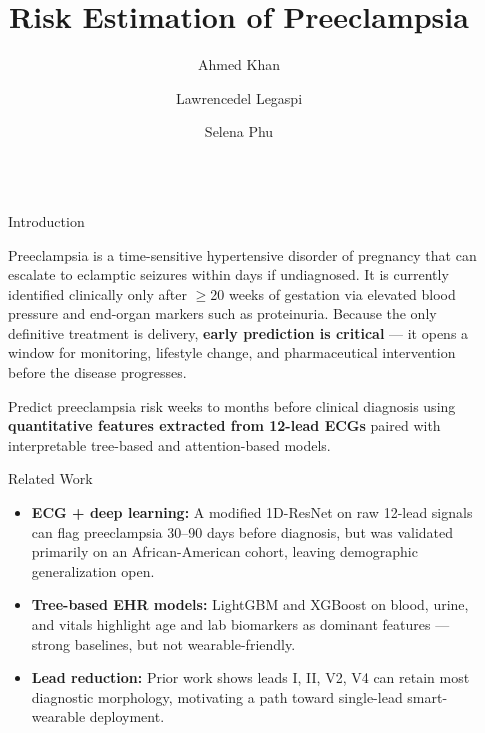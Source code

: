 \documentclass[final]{beamer}
\title{Risk Estimation of Preeclampsia}
\author{Ahmed Khan \and Lawrencedel Legaspi \and Selena Phu}
\institute[shortinst]{Department of Electrical and Computer Engineering}
\newlength{\sepwidth}
\newlength{\colwidth}
\newcommand{\separatorcolumn}{\begin{column}{\sepwidth}\end{column}}
\begin{document}
\begin{frame}[t]
\begin{columns}[t]
\separatorcolumn

\begin{column}{\colwidth}

  \begin{block}{Introduction}

    Preeclampsia is a time-sensitive hypertensive disorder of pregnancy that
    can escalate to eclamptic seizures within days if undiagnosed. It is
    currently identified clinically only after $\geq$20 weeks of gestation
    via elevated blood pressure and end-organ markers such as proteinuria.
    Because the only definitive treatment is delivery, \textbf{early
    prediction is critical} --- it opens a window for monitoring, lifestyle
    change, and pharmaceutical intervention before the disease progresses.


    Predict preeclampsia risk weeks to months before clinical diagnosis
    using \textbf{quantitative features extracted from 12-lead ECGs} paired
    with interpretable tree-based and attention-based models.

  \end{block}

  \begin{block}{Related Work}

    \begin{itemize}
      \item \textbf{ECG + deep learning:} A modified 1D-ResNet on raw
        12-lead signals can flag preeclampsia 30--90 days before diagnosis,
        but was validated primarily on an African-American cohort, leaving
        demographic generalization open.
      \item \textbf{Tree-based EHR models:} LightGBM and XGBoost on blood,
        urine, and vitals highlight age and lab biomarkers as dominant
        features --- strong baselines, but not wearable-friendly.
      \item \textbf{Lead reduction:} Prior work shows leads I, II, V2, V4
        can retain most diagnostic morphology, motivating a path toward
        single-lead smart-wearable deployment.
    \end{itemize}

  \end{block}


\end{column}
\end{columns}
\end{frame}
\end{document}
